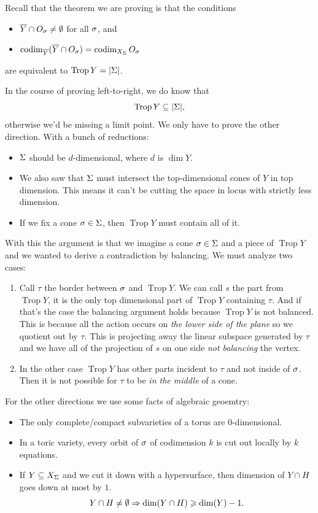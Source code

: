 \documentclass[12pt]{memoir}
\DeclareMathOperator{\Trop}{Trop}
\begin{document}
Recall that the theorem we are proving is that the conditions
\begin{itemize}
    \item $\overline Y\cap O_\sigma\neq \emptyset$  for all $\sigma$, and
    \item $\operatorname{codim}_{\overline Y}(\overline Y\cap O_\sigma)=\operatorname{codim}_{X_\Sigma} O_\sigma$
\end{itemize}
are equivalent to $\Trop Y=|\Sg|$.\par 
In the course of proving left-to-right, we do know that 
$$\Trop Y\subseteq |\Sg|,$$
otherwise we'd be missing a limit point. We only have to prove the other direction. With a bunch of reductions:
\begin{itemize}
    \item $\Sigma$ should be $d$-dimensional, where $d$ is $\dim Y$.
    \item We also saw that $\Sigma$ must intersect the top-dimensional cones of $Y$ in top dimension. This means it can't be cutting the space in locus with strictly less dimension.
    \item If we fix a cone $\sigma\in\Sigma$, then $\Trop Y$ must contain all of it.
\end{itemize}
With this the argument is that we imagine a cone $\sigma\in\Sigma$ and a piece of $\Trop Y$ and we wanted to derive a contradiction by balancing. We must analyze two cases:
\begin{enumerate}
    \item Call $\tau$ the border between $\sigma$ and $\Trop Y$. We can call $s$ the part from $\Trop Y$, it is the only top dimensional part of $\Trop Y$ containing $\tau$. And if that's the case the balancing argument holds because 
    $\Trop Y$ is not balanced. This is because all the action occurs on \emph{the lower side of the plane} so we quotient out by $\tau$. This is projecting away the linear subspace generated by $\tau$ and we have all of the projection of $s$ on one side \emph{not balancing} the vertex.
    \item In the other case $\Trop Y$ has other parts incident to $\tau$ and not inside of $\sigma$. Then it is not possible for $\tau$ to be \emph{in the middle} of a cone. 
\end{enumerate}
For the other directions we use some facts of algebraic geoemtry:
\begin{itemize}
    \item The only complete/compact subvarieties of a torus are 0-dimensional.
    \item In a toric variety, every orbit of $\sigma$ of codimension $k$ is cut out locally by $k$ equations.
    \item If $Y\subseteq X_\Sigma$ and we cut it down with a hypersurface, then dimension of $Y\cap H$ goes down at most by $1$.
    $$Y\cap H\neq\emptyset\Rightarrow \dim(Y\cap H)\geqslant \dim(Y)-1.$$
\end{itemize}
\end{document}
